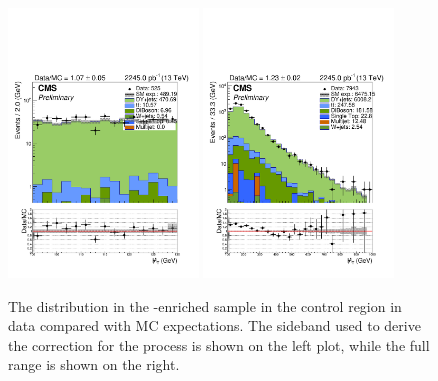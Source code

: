 \begin{figure}[!h]
  \centering
  \includegraphics[width=0.45\textwidth]{figures/sidebandCorr/mhtSideband_NMinusOne_MHT_DYJetsToLL}
  \includegraphics[width=0.45\textwidth]{figures/sidebandCorr/mht_NMinusOne_MHT_DYJetsToLL}
  \caption{The \mht distribution in the \zj-enriched sample in the \mmj control region in data compared with MC expectations. 
     The \mht sideband used to derive the correction for the \zj process is shown on the left plot, while the full range is shown on the right.}
  \label{fig:zjets_MHTsideband}
\end{figure}

